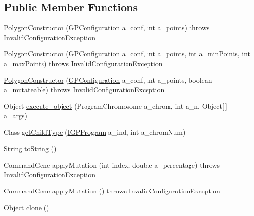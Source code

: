 \subsection*{Public Member Functions}
\begin{DoxyCompactItemize}
\item 
\hyperlink{classexamples_1_1gp_1_1monalisa_1_1core_1_1commands_1_1_polygon_constructor_a8f5a07cb091e105372da18f6567c5a6e}{Polygon\-Constructor} (\hyperlink{classorg_1_1jgap_1_1gp_1_1impl_1_1_g_p_configuration}{G\-P\-Configuration} a\-\_\-conf, int a\-\_\-points)  throws Invalid\-Configuration\-Exception 
\item 
\hyperlink{classexamples_1_1gp_1_1monalisa_1_1core_1_1commands_1_1_polygon_constructor_a00f7d8fd75b225ee901b8a805accddb3}{Polygon\-Constructor} (\hyperlink{classorg_1_1jgap_1_1gp_1_1impl_1_1_g_p_configuration}{G\-P\-Configuration} a\-\_\-conf, int a\-\_\-points, int a\-\_\-min\-Points, int a\-\_\-max\-Points)  throws Invalid\-Configuration\-Exception 
\item 
\hyperlink{classexamples_1_1gp_1_1monalisa_1_1core_1_1commands_1_1_polygon_constructor_a41ba225548281b7ad9f1713469a8f306}{Polygon\-Constructor} (\hyperlink{classorg_1_1jgap_1_1gp_1_1impl_1_1_g_p_configuration}{G\-P\-Configuration} a\-\_\-conf, int a\-\_\-points, boolean a\-\_\-mutateable)  throws Invalid\-Configuration\-Exception 
\item 
Object \hyperlink{classexamples_1_1gp_1_1monalisa_1_1core_1_1commands_1_1_polygon_constructor_a050c95edf32aac71284efa5eab198a6b}{execute\-\_\-object} (Program\-Chromosome a\-\_\-chrom, int a\-\_\-n, Object\mbox{[}$\,$\mbox{]} a\-\_\-args)
\item 
Class \hyperlink{classexamples_1_1gp_1_1monalisa_1_1core_1_1commands_1_1_polygon_constructor_a33a42b190402e75f5987172d899af690}{get\-Child\-Type} (\hyperlink{interfaceorg_1_1jgap_1_1gp_1_1_i_g_p_program}{I\-G\-P\-Program} a\-\_\-ind, int a\-\_\-chrom\-Num)
\item 
String \hyperlink{classexamples_1_1gp_1_1monalisa_1_1core_1_1commands_1_1_polygon_constructor_a03a85afba2ef06c16c9d75f355a8ab0e}{to\-String} ()
\item 
\hyperlink{classorg_1_1jgap_1_1gp_1_1_command_gene}{Command\-Gene} \hyperlink{classexamples_1_1gp_1_1monalisa_1_1core_1_1commands_1_1_polygon_constructor_a62c0be8344c62b6d712d89edfbb2b288}{apply\-Mutation} (int index, double a\-\_\-percentage)  throws Invalid\-Configuration\-Exception 
\item 
\hyperlink{classorg_1_1jgap_1_1gp_1_1_command_gene}{Command\-Gene} \hyperlink{classexamples_1_1gp_1_1monalisa_1_1core_1_1commands_1_1_polygon_constructor_a05b0945476fcf4dbd7acba176889682b}{apply\-Mutation} ()  throws Invalid\-Configuration\-Exception 
\item 
Object \hyperlink{classexamples_1_1gp_1_1monalisa_1_1core_1_1commands_1_1_polygon_constructor_a5dfeeab631c47b92c203f54155dadfed}{clone} ()
\end{DoxyCompactItemize}
